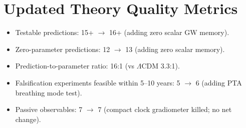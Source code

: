 \documentclass[11pt]{article}
\newcommand{\LCDM}{$\Lambda$CDM}
\begin{document}
\section{Updated Theory Quality Metrics}

\begin{itemize}[nosep]
\item Testable predictions: 15+ $\to$ 16+ (adding zero scalar GW memory).
\item Zero-parameter predictions: 12 $\to$ 13 (adding zero scalar memory).
\item Prediction-to-parameter ratio: 16:1 (vs \LCDM{} 3.3:1).
\item Falsification experiments feasible within 5--10 years: 5 $\to$ 6
  (adding PTA breathing mode test).
\item Passive observables: 7 $\to$ 7 (compact clock gradiometer killed;
  no net change).
\end{itemize}
\end{document}
